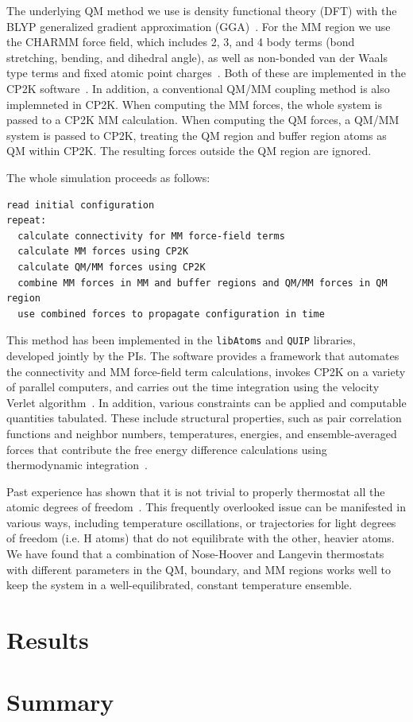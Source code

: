 \documentclass[11pt]{revtex4}
\begin{document}
The underlying QM method we use is density functional theory (DFT)
with the BLYP generalized gradient approximation (GGA)~\cite{kohn_phys_rev_1965a,becke_phys_rev_a_1988a,lee_phys_rev_b_1988a}.  For
the MM region we use the CHARMM force field, which includes 2, 3,
and 4 body terms (bond stretching, bending, and dihedral angle),
as well as non-bonded van der Waals type terms and fixed atomic
point charges~\cite{brooks_j_comp_chem_2009a}.  Both of these are implemented in the CP2K
software~\cite{vandevondele_comp_phys_comm_2005a,laino_j_chem_theor_comp_2006a}.  In addition, a conventional QM/MM coupling
method is also implemneted in CP2K.  When computing the MM forces,
the whole system is passed to a CP2K MM calculation.  When computing
the QM forces, a QM/MM system is passed to CP2K, treating the QM
region and buffer region atoms as QM within CP2K.  The resulting
forces outside the QM region are ignored.


The whole simulation proceeds as follows:
\begin{verbatim}
read initial configuration
repeat:
  calculate connectivity for MM force-field terms
  calculate MM forces using CP2K
  calculate QM/MM forces using CP2K
  combine MM forces in MM and buffer regions and QM/MM forces in QM region
  use combined forces to propagate configuration in time
\end{verbatim}
This method has been implemented in the {\tt libAtoms} and {\tt QUIP}
libraries, developed jointly by the PIs.  The software provides a framework
that automates the connectivity and MM force-field term calculations,
invokes CP2K on a variety of parallel computers, and carries out the time
integration using the velocity Verlet algorithm~\cite{frenkel_2002a}.  In addition,
various constraints can be applied and computable quantities tabulated.
These include structural properties, such as pair correlation functions
and neighbor numbers, temperatures, energies, and ensemble-averaged
forces that contribute the free energy difference calculations using
thermodynamic integration~\cite{frenkel_2002b}.

Past experience has shown that it is not trivial to properly thermostat
all the atomic degrees of freedom~\cite{winfield_thesis_2009a}.
This frequently overlooked issue can be manifested in various ways, including
temperature oscillations, or trajectories for light degrees of freedom
(i.e. H atoms) that do not equilibrate with the other, heavier atoms.
We have found that a combination of Nose-Hoover and Langevin thermostats
with different parameters in the QM, boundary, and MM regions works well
to keep the system in a well-equilibrated, constant temperature ensemble.

\section{Results}

\section{Summary}


\end{document}
